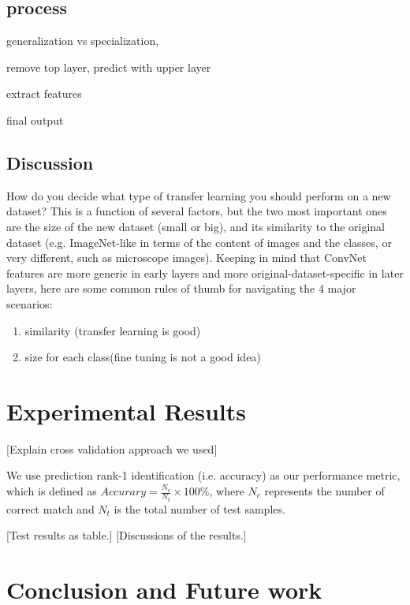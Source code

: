 \documentclass[journal, 10pt]{IEEEtran}
\begin{document}
  \subsection{process}


  generalization vs specialization,

  remove top layer,
  predict with upper layer

  extract features

  final output

  \subsection{Discussion}
    How do you decide what type of transfer learning you should perform on a new dataset? This is a function of several factors, but the two most important ones are the size of the new dataset (small or big), and its similarity to the original dataset (e.g. ImageNet-like in terms of the content of images and the classes, or very different, such as microscope images). Keeping in mind that ConvNet features are more generic in early layers and more original-dataset-specific in later layers, here are some common rules of thumb for navigating the 4 major scenarios:
    \cite{CS231N}

    \begin{enumerate}
      \item similarity (transfer learning is good)
      \item size for each class(fine tuning is not a good idea)
    \end{enumerate}



\section{Experimental Results}
[Explain cross validation approach we used]

We use prediction rank-1 identification (i.e. accuracy) as our performance metric, which is defined as $Accurary = \frac{N_c}{N_t} \times 100 \%$, where $N_c$ represents the number of correct match and $N_t$ is the total number of test samples.


[Test results as table.]
[Discussions of the results.]


\section{Conclusion and Future work}
\end{document}
